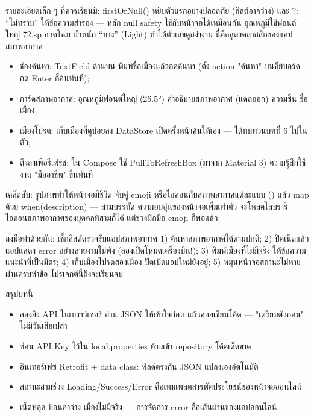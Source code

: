 รายละเอียดเล็ก ๆ ที่ควรเรียนมี: firstOrNull() หยิบตัวแรกอย่างปลอดภัย (ลิสต์อาจว่าง) และ ?: “ไม่ทราบ” ให้ข้อความสำรอง — หลัก null safety ใช้กับหน้าจอได้เหมือนกัน อุณหภูมิใช้ฟอนต์ใหญ่ 72.sp อวดโฉม น้ำหนัก “บาง” (Light) ทำให้ตัวเลขดูสง่างาม นี่คือสูตรคลาสสิกของแอปสภาพอากาศ



\begin{itemize}
  \item ช่องค้นหา: TextField ด้านบน พิมพ์ชื่อเมืองแล้วกดค้นหา (ตั้ง action "ค้นหา" บนคีย์บอร์ด กด Enter ก็ค้นทันที);
  \item การ์ดสภาพอากาศ: อุณหภูมิฟอนต์ใหญ่ (26.5°) คำอธิบายสภาพอากาศ (แดดออก) ความชื้น ชื่อเมือง;
  \item เมืองโปรด: เก็บเมืองที่ดูบ่อยลง DataStore เปิดครั้งหน้าค้นให้เอง — ได้ทบทวนบทที่ 6 ไปในตัว;
  \item ดึงลงเพื่อรีเฟรช: ใน Compose ใช้ PullToRefreshBox (มาจาก Material 3) ความรู้สึกใช้งาน "มืออาชีพ" ขึ้นทันที
\end{itemize}

\begin{tcbinfo}{เคล็ดลับ: รูปภาพทำให้หน้าจอมีชีวิต}
จับคู่ emoji หรือไอคอนกับสภาพอากาศแต่ละแบบ () แล้ว map ด้วย when(description) — สามบรรทัด ความอบอุ่นของหน้าจอเพิ่มเท่าตัว จะโหลดไลบรารีไอคอนสภาพอากาศของบุคคลที่สามก็ได้ แต่ช่วงฝึกมือ emoji ก็พอแล้ว

\end{tcbinfo}

\begin{tcbpractice}{ลงมือทำด้วยกัน: เช็กลิสต์ตรวจรับแอปสภาพอากาศ}
1) ค้นหาสภาพอากาศได้ตามปกติ; 2) ปิดเน็ตแล้วแอปแสดง error อย่างสวยงามไม่พัง (ลองเปิดโหมดเครื่องบิน!); 3) พิมพ์เมืองที่ไม่มีจริง ให้ข้อความแนะนำที่เป็นมิตร; 4) เก็บเมืองโปรดสองเมือง ปิดเปิดแอปใหม่ยังอยู่; 5) หมุนหน้าจอสถานะไม่หาย ผ่านครบห้าข้อ โปรเจกต์นี้ถึงจะเรียนจบ

\end{tcbpractice}

\begin{tcbsummary}{สรุปบทนี้}
\begin{itemize}
  \item ลองยิง API ในเบราว์เซอร์ อ่าน JSON ให้เข้าใจก่อน แล้วค่อยเขียนโค้ด — "เตรียมตัวก่อน" ไม่มีวันเสียเปล่า
  \item ซ่อน API Key ไว้ใน local.properties ห้ามเข้า repository โค้ดเด็ดขาด
  \item อินเทอร์เฟซ Retrofit + data class: ฟิลด์ตรงกัน JSON แปลงเองอัตโนมัติ
  \item สถานะสามช่วง Loading/Success/Error คือเทมเพลตสารพัดประโยชน์ของหน้าจอออนไลน์
  \item เน็ตหลุด ป้อนค่าว่าง เมืองไม่มีจริง — การจัดการ error คือเส้นผ่านของแอปออนไลน์
\end{itemize}

\end{tcbsummary}
